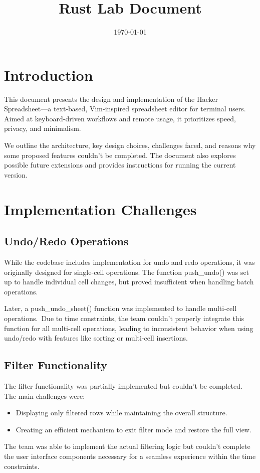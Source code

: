 \documentclass[a4paper,12pt]{article}
\title{Rust Lab Document\vspace{-1.5em } }
\author{}
\date{\today}
\begin{document}
\maketitle

\section{Introduction}
This document presents the design and implementation of the Hacker Spreadsheet—a text-based, Vim-inspired spreadsheet editor for terminal users. Aimed at keyboard-driven workflows and remote usage, it prioritizes speed, privacy, and minimalism.

We outline the architecture, key design choices, challenges faced, and reasons why some proposed features couldn’t be completed. The document also explores possible future extensions and provides instructions for running the current version.
\section{Implementation Challenges}
\subsection{Undo/Redo Operations}
While the codebase includes implementation for undo and redo operations, it was originally designed for single-cell operations. The function push\_undo() was set up to handle individual cell changes, but proved insufficient when handling batch operations.

Later, a push\_undo\_sheet() function was implemented to handle multi-cell operations.\ Due to time constraints, the team couldn't properly integrate this function for all multi-cell operations, leading to inconsistent behavior when using undo/redo with features like sorting or multi-cell insertions.
\subsection{Filter Functionality}
The filter functionality was partially implemented but couldn't be completed. The main challenges were:
\begin{itemize}
    \item Displaying only filtered rows while maintaining the overall structure.
    \item Creating an efficient mechanism to exit filter mode and restore the full view.
\end{itemize}
The team was able to implement the actual filtering logic but couldn't complete the user interface components necessary for a seamless experience within the time constraints.
\end{document}
